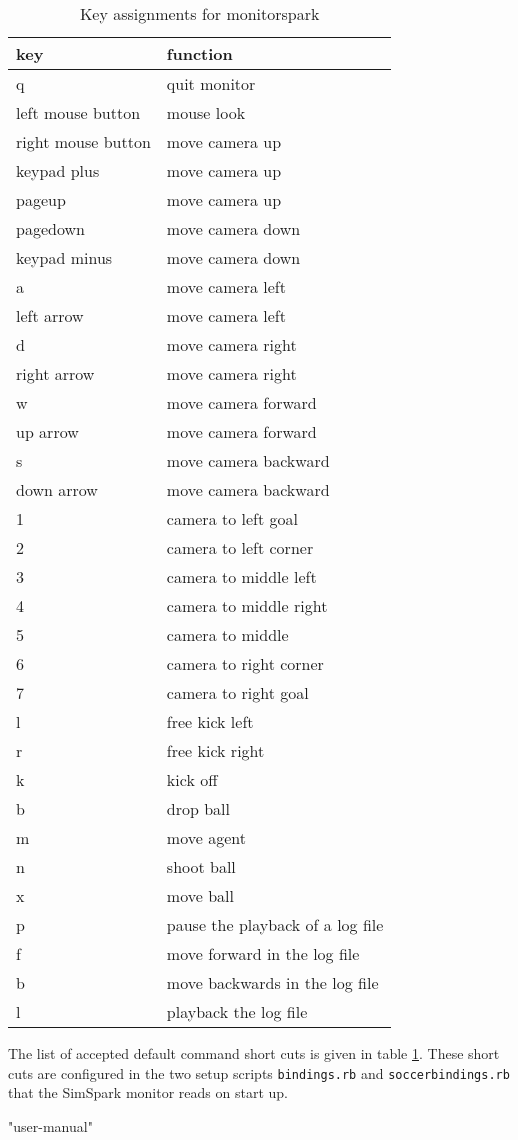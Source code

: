 \begin{table}
\label {table:monitorspark}
\caption{Key assignments for monitorspark}
\begin{center}
\begin{tabular}{|l|l|}
{\bf key} & {\bf function} \\
\hline
q & quit monitor \\
\hline
left mouse button & mouse look \\
right mouse button & move camera up \\
keypad plus & move camera up \\
pageup & move camera up \\
pagedown & move camera down \\
keypad minus & move camera down \\
a & move camera left \\
left arrow & move camera left \\
d & move camera right \\
right arrow & move camera right \\
w & move camera forward \\
up arrow & move camera forward \\
s & move camera backward \\
down arrow & move camera backward \\
\hline
1 & camera to left goal \\
2 & camera to left corner \\
3 & camera to middle left \\
4 & camera to middle right \\
5 & camera to middle \\
6 & camera to right corner \\
7 & camera to right goal \\
\hline
l & free kick left \\
r & free kick right \\
k & kick off \\
b & drop ball \\
m & move agent \\
n & shoot ball \\
x & move ball \\
\hline
p & pause the playback of a log file \\
f & move forward in the log file \\
b & move backwards in the log file \\
l & playback the log file \\
\hline
\end{tabular}
\end{center}
\end{table}

The list of accepted default command short cuts is given in table
\ref{table:monitorspark}. These short cuts are configured in the two setup
scripts \texttt{bindings.rb} and \texttt{soccerbindings.rb} that the
SimSpark monitor reads on start up.

"user-manual" %
